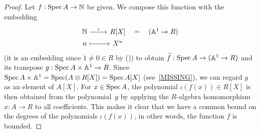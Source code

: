 \begin{proof}
  Let $f : \operatorname{Spec} A \to \mathbb{N}$ be given.
  We compose this function with the embedding
  \[ \begin{tikzcd}[row sep=0mm]
    \N \ar[r, "\iota"] & R[X] \ar[r, phantom, "{=}"] & (\bA^1 \to R) \\
    n \ar[r, mapsto] & X^n
  \end{tikzcd} \]
  (it is an embedding since $1 \neq 0 \in R$ by ())
  to obtain $\widetilde{f} : \operatorname{Spec} A \to (\mathbb{A}^1 \to R)$
  and its transpose $g : \operatorname{Spec} A \times \mathbb{A}^1 \to R$.
  Since $\operatorname{Spec} A \times \mathbb{A}^1 = \operatorname{Spec} (A \otimes R[X]) = \operatorname{Spec} A[X]$
  (see~\ref{MISSING}),
  we can regard $g$ as an element of $A[X]$.
  For $x \in \operatorname{Spec} A$,
  the polynomial $\iota(f(x)) \in R[X]$ is then obtained from the polynomial~$g$
  by applying the $R$-algebra homomorphism $x : A \to R$ to all coefficients.
  This makes it clear that
  we have a common bound on the degrees of the polynomials $\iota(f(x))$,
  in other words,
  the function $f$ is bounded.
\end{proof}
